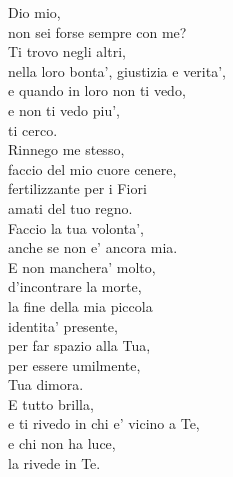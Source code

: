 \begin{haiku}
    Dio mio,\\
    non sei forse sempre con me?\\
    Ti trovo negli altri,\\
    nella loro bonta', giustizia e verita',\\
    e quando in loro non ti vedo,\\
    e non ti vedo piu',\\
    ti cerco.\\
    Rinnego me stesso,\\
    faccio del mio cuore cenere,\\
    fertilizzante per i Fiori\\
    amati del tuo regno.\\
    Faccio la tua volonta',\\
    anche se non e' ancora mia.\\
    E non manchera' molto,\\
    d'incontrare la morte,\\
    la fine della mia piccola\\
    identita' presente,\\
    per far spazio alla Tua,\\
    per essere umilmente,\\
    Tua dimora.\\
    E tutto brilla,\\
    e ti rivedo in chi e' vicino a Te,\\
    e chi non ha luce,\\
    la rivede in Te.\\
\end{haiku}


